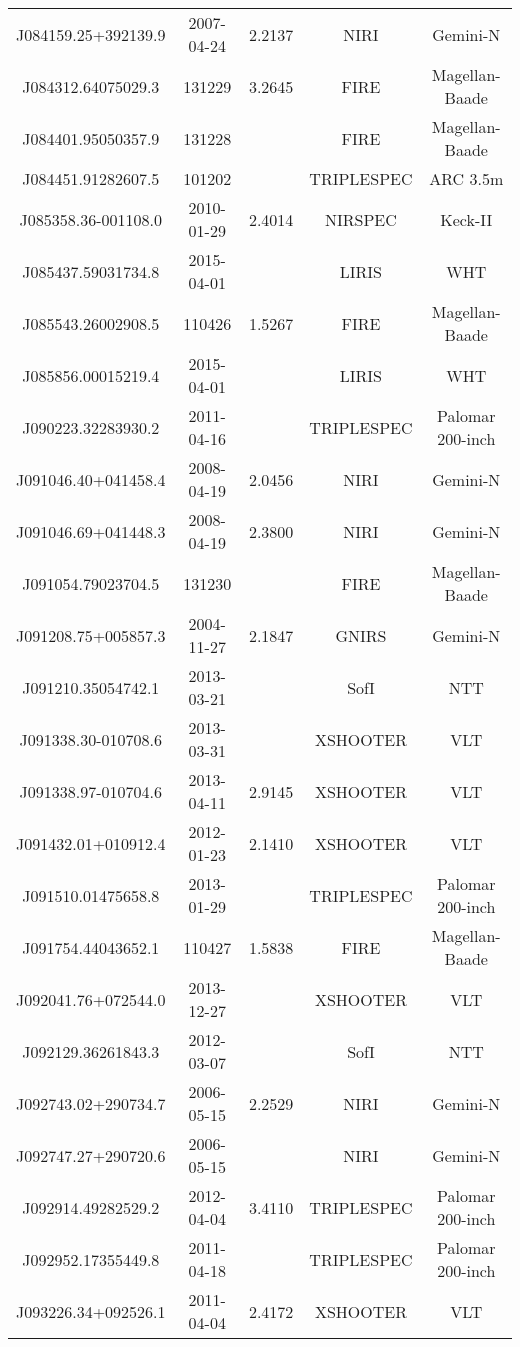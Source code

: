 {\begin{longtable}{ccccc}
J084159.25+392139.9 & 2007-04-24 & 2.2137 & NIRI & Gemini-N \\
J084312.64075029.3 & 131229 & 3.2645 & FIRE & Magellan-Baade \\
J084401.95050357.9 & 131228 &  & FIRE & Magellan-Baade \\
J084451.91282607.5 & 101202 &  & TRIPLESPEC & ARC 3.5m \\
J085358.36-001108.0 & 2010-01-29 & 2.4014 & NIRSPEC & Keck-II \\
J085437.59031734.8 & 2015-04-01 &  & LIRIS & WHT \\
J085543.26002908.5 & 110426 & 1.5267 & FIRE & Magellan-Baade \\
J085856.00015219.4 & 2015-04-01 &  & LIRIS & WHT \\
J090223.32283930.2 & 2011-04-16 &  & TRIPLESPEC & Palomar 200-inch \\
J091046.40+041458.4 & 2008-04-19 & 2.0456 & NIRI & Gemini-N \\
J091046.69+041448.3 & 2008-04-19 & 2.3800 & NIRI & Gemini-N \\
J091054.79023704.5 & 131230 &  & FIRE & Magellan-Baade \\
J091208.75+005857.3 & 2004-11-27 & 2.1847 & GNIRS & Gemini-N \\
J091210.35054742.1 & 2013-03-21 &  & SofI & NTT \\
J091338.30-010708.6 & 2013-03-31 &  & XSHOOTER & VLT \\
J091338.97-010704.6 & 2013-04-11 & 2.9145 & XSHOOTER & VLT \\
J091432.01+010912.4 & 2012-01-23 & 2.1410 & XSHOOTER & VLT \\
J091510.01475658.8 & 2013-01-29 &  & TRIPLESPEC & Palomar 200-inch \\
J091754.44043652.1 & 110427 & 1.5838 & FIRE & Magellan-Baade \\
J092041.76+072544.0 & 2013-12-27 &  & XSHOOTER & VLT \\
J092129.36261843.3 & 2012-03-07 &  & SofI & NTT \\
J092743.02+290734.7 & 2006-05-15 & 2.2529 & NIRI & Gemini-N \\
J092747.27+290720.6 & 2006-05-15 &  & NIRI & Gemini-N \\
J092914.49282529.2 & 2012-04-04 & 3.4110 & TRIPLESPEC & Palomar 200-inch \\
J092952.17355449.8 & 2011-04-18 &  & TRIPLESPEC & Palomar 200-inch \\
J093226.34+092526.1 & 2011-04-04 & 2.4172 & XSHOOTER & VLT \\

\end{longtable}}
